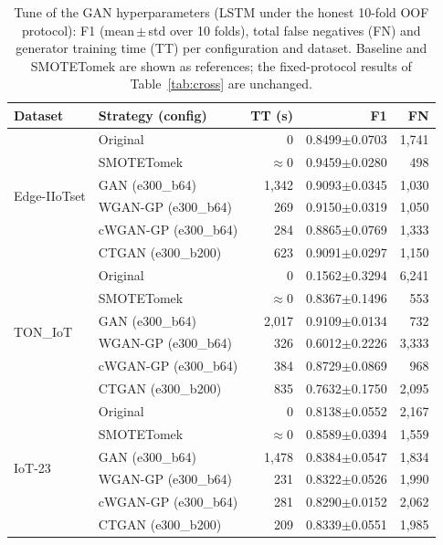 \begin{table}[!t]
\centering
\caption{Tune of the GAN hyperparameters (LSTM under the honest 10-fold OOF protocol): F1 (mean\,$\pm$\,std over 10 folds), total false negatives (FN) and generator training time (TT) per configuration and dataset. Baseline and SMOTETomek are shown as references; the fixed-protocol results of Table~\ref{tab:cross} are unchanged.}
\label{tab:tune}
\footnotesize
\setlength{\tabcolsep}{4pt}
\begin{tabular}{@{}llrrr@{}}
\toprule
Dataset & Strategy (config) & TT (s) & F1 & FN \\
\midrule
\multirow{6}{*}{Edge-IIoTset}
 & Original             & 0      & 0.8499$\pm$0.0703 & 1{,}741 \\
 & SMOTETomek           & $\approx$0 & 0.9459$\pm$0.0280 & 498 \\
 & GAN (e300\_b64)      & 1{,}342 & 0.9093$\pm$0.0345 & 1{,}030 \\
 & WGAN-GP (e300\_b64)  & 269    & 0.9150$\pm$0.0319 & 1{,}050 \\
 & cWGAN-GP (e300\_b64) & 284    & 0.8865$\pm$0.0769 & 1{,}333 \\
 & CTGAN (e300\_b200)   & 623    & 0.9091$\pm$0.0297 & 1{,}150 \\
\multirow{6}{*}{TON\_IoT}
 & Original             & 0      & 0.1562$\pm$0.3294 & 6{,}241 \\
 & SMOTETomek           & $\approx$0 & 0.8367$\pm$0.1496 & 553 \\
 & GAN (e300\_b64)      & 2{,}017 & 0.9109$\pm$0.0134 & 732 \\
 & WGAN-GP (e300\_b64)  & 326    & 0.6012$\pm$0.2226 & 3{,}333 \\
 & cWGAN-GP (e300\_b64) & 384    & 0.8729$\pm$0.0869 & 968 \\
 & CTGAN (e300\_b200)   & 835    & 0.7632$\pm$0.1750 & 2{,}095 \\
\multirow{6}{*}{IoT-23}
 & Original             & 0      & 0.8138$\pm$0.0552 & 2{,}167 \\
 & SMOTETomek           & $\approx$0 & 0.8589$\pm$0.0394 & 1{,}559 \\
 & GAN (e300\_b64)      & 1{,}478 & 0.8384$\pm$0.0547 & 1{,}834 \\
 & WGAN-GP (e300\_b64)  & 231    & 0.8322$\pm$0.0526 & 1{,}990 \\
 & cWGAN-GP (e300\_b64) & 281    & 0.8290$\pm$0.0152 & 2{,}062 \\
 & CTGAN (e300\_b200)   & 209    & 0.8339$\pm$0.0551 & 1{,}985 \\
\bottomrule
\end{tabular}
\end{table}

